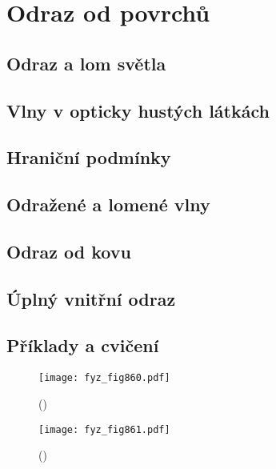 {
\chapter{Odraz od povrchů}\label{fyz:IIchapXXXIII}
\minitoc
  \section{Odraz a lom světla}\label{fyz:IIchapXXXIIIsecI}
  \section{Vlny v opticky hustých látkách}\label{fyz:IIchapXXXIIIsecII}
  \section{Hraniční podmínky}\label{fyz:IIchapXXXIIIsecIII}
  \section{Odražené a lomené vlny}\label{fyz:IIchapXXXIIIsecIV}
  \section{Odraz od kovu}\label{fyz:IIchapXXXIIIsecV}
  \section{Úplný vnitřní odraz}\label{fyz:IIchapXXXIIIsecVI}
  \section{Příklady a cvičení}\label{fyz:IIchapXXXIIIsecVII}

    \begin{figure}[ht!] %
      \centering
      \texttt{[image: fyz\_fig860.pdf]}
      \caption{
               (\cite[s.~707]{Feynman02})}
      \label{fyz_fig860}
    \end{figure}

    \begin{figure}[ht!] %
      \centering
      \texttt{[image: fyz\_fig861.pdf]}
      \caption{
               (\cite[s.~707]{Feynman02})}
      \label{fyz_fig861}
    \end{figure}

}
